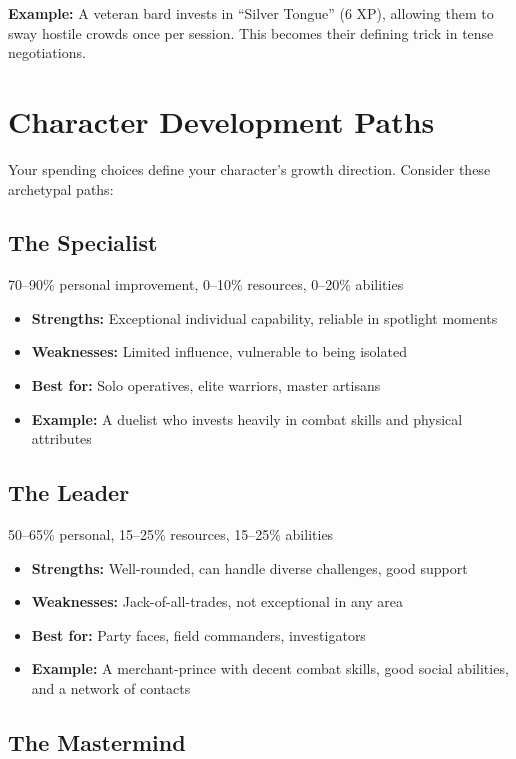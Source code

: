 \documentclass[11pt,twoside,openany]{book}
\begin{document}
\textbf{Example:} A veteran bard invests in ``Silver Tongue'' (6 XP), allowing them to sway hostile crowds once per session. This becomes their defining trick in tense negotiations.

\section*{Character Development Paths} 

Your spending choices define your character's growth direction. Consider these archetypal paths:

\subsection*{The Specialist}

70--90\% personal improvement, 0--10\% resources, 0--20\% abilities
\begin{itemize}
\item \textbf{Strengths:} Exceptional individual capability, reliable in spotlight moments
\item \textbf{Weaknesses:} Limited influence, vulnerable to being isolated
\item \textbf{Best for:} Solo operatives, elite warriors, master artisans
\item \textbf{Example:} A duelist who invests heavily in combat skills and physical attributes
\end{itemize}

\subsection*{The Leader}

50--65\% personal, 15--25\% resources, 15--25\% abilities
\begin{itemize}
\item \textbf{Strengths:} Well-rounded, can handle diverse challenges, good support
\item \textbf{Weaknesses:} Jack-of-all-trades, not exceptional in any area
\item \textbf{Best for:} Party faces, field commanders, investigators
\item \textbf{Example:} A merchant-prince with decent combat skills, good social abilities, and a network of contacts
\end{itemize}

\subsection*{The Mastermind}
\end{document}
